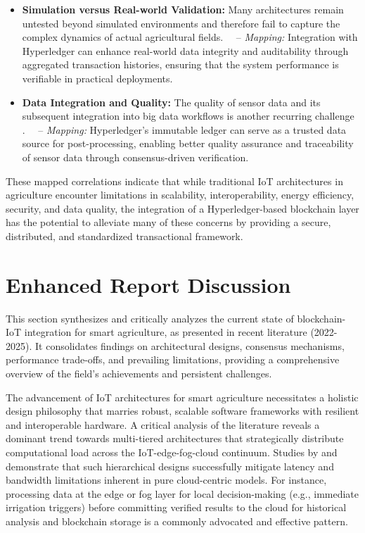 \documentclass[12pt,onecolumn]{IEEEtran} %
\begin{document}
\begin{itemize}
\item \textbf{Simulation versus Real-world Validation:} Many architectures remain untested beyond simulated environments \cite{bayih2022utilizationofinternet, atalla2023iotenabledprecisionagriculture} and therefore fail to capture the complex dynamics of actual agricultural fields.  
 – \textit{Mapping:} Integration with Hyperledger can enhance real-world data integrity and auditability through aggregated transaction histories, ensuring that the system performance is verifiable in practical deployments.

\item \textbf{Data Integration and Quality:} The quality of sensor data and its subsequent integration into big data workflows is another recurring challenge \cite{ouafiq2022datamanagementand, ouafiq2022datamanagementand}.  
 – \textit{Mapping:} Hyperledger’s immutable ledger can serve as a trusted data source for post-processing, enabling better quality assurance and traceability of sensor data through consensus-driven verification.
\end{itemize}

These mapped correlations indicate that while traditional IoT architectures in agriculture encounter limitations in scalability, interoperability, energy efficiency, security, and data quality, the integration of a Hyperledger-based blockchain layer has the potential to alleviate many of these concerns by providing a secure, distributed, and standardized transactional framework.

\section{Enhanced Report Discussion}
\noindent This section synthesizes and critically analyzes the current state of blockchain-IoT integration for smart agriculture, as presented in recent literature (2022-2025). It consolidates findings on architectural designs, consensus mechanisms, performance trade-offs, and prevailing limitations, providing a comprehensive overview of the field's achievements and persistent challenges.

The advancement of IoT architectures for smart agriculture necessitates a holistic design philosophy that marries robust, scalable software frameworks with resilient and interoperable hardware. A critical analysis of the literature reveals a dominant trend towards multi-tiered architectures that strategically distribute computational load across the IoT-edge-fog-cloud continuum. Studies by \cite{akhter2022precisionagricultureusing} and \cite{atalla2023iotenabledprecisionagriculture} demonstrate that such hierarchical designs successfully mitigate latency and bandwidth limitations inherent in pure cloud-centric models. For instance, processing data at the edge or fog layer for local decision-making (e.g., immediate irrigation triggers) before committing verified results to the cloud for historical analysis and blockchain storage is a commonly advocated and effective pattern.
\end{document}

